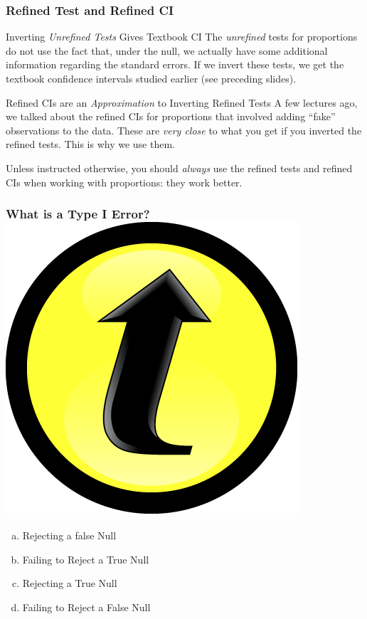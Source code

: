 \documentclass[handout]{beamer}
\begin{document}
\begin{frame}
\frametitle{Refined Test and Refined CI}
\small
\begin{block}{Inverting \emph{Unrefined Tests} Gives Textbook CI}
The \emph{unrefined} tests for proportions do not use the fact that, under the null, we actually have some additional information regarding the standard errors. If we invert these tests, we get the textbook confidence intervals studied earlier (see preceding slides). 
\end{block}

\pause

\begin{block}{Refined CIs are an \emph{Approximation} to Inverting Refined Tests}
A few lectures ago, we talked about the refined CIs for proportions that involved adding ``fake'' observations to the data. These are \emph{very close} to what you get if you inverted the refined tests. \alert{This is why we use them.}
\end{block}

\pause

\vspace{1em} 
\large
\alert{Unless instructed otherwise, you should \emph{always} use the refined tests and refined CIs when working with proportions: they work better.}

\end{frame}
\begin{frame}
\frametitle{What is a Type I Error? \includegraphics[scale = 0.05]{./images/clicker}}

\begin{enumerate}[(a)]
	\item Rejecting a false Null
	\item Failing to Reject a True Null
	\item Rejecting a True Null
	\item Failing to Reject a False Null
\end{enumerate}

\end{frame}
\end{document}
